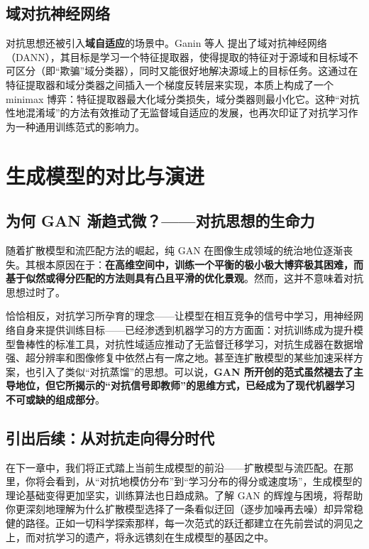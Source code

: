 \subsection{域对抗神经网络}

对抗思想还被引入\textbf{域自适应}的场景中。Ganin 等人\cite{ganin2016domainadversarialtrainingneuralnetworks} 提出了域对抗神经网络（DANN），其目标是学习一个特征提取器，使得提取的特征对于源域和目标域不可区分（即“欺骗”域分类器），同时又能很好地解决源域上的目标任务。这通过在特征提取器和域分类器之间插入一个梯度反转层来实现，本质上构成了一个 minimax 博弈：特征提取器最大化域分类损失，域分类器则最小化它。这种“对抗性地混淆域”的方法有效推动了无监督域自适应的发展，也再次印证了对抗学习作为一种通用训练范式的影响力。

\section{生成模型的对比与演进}

\subsection{为何 GAN 渐趋式微？——对抗思想的生命力}

随着扩散模型和流匹配方法的崛起，纯 GAN 在图像生成领域的统治地位逐渐丧失。其根本原因在于：\textbf{在高维空间中，训练一个平衡的极小极大博弈极其困难，而基于似然或得分匹配的方法则具有凸且平滑的优化景观}。然而，这并不意味着对抗思想过时了。

恰恰相反，对抗学习所孕育的理念——让模型在相互竞争的信号中学习，用神经网络自身来提供训练目标——已经渗透到机器学习的方方面面：对抗训练成为提升模型鲁棒性的标准工具，对抗性域适应推动了无监督迁移学习，对抗生成器在数据增强、超分辨率和图像修复中依然占有一席之地。甚至连扩散模型的某些加速采样方案，也引入了类似“对抗蒸馏”的思想\cite{sauer2022styleganxlscalingstyleganlarge}。可以说，\textbf{GAN 所开创的范式虽然褪去了主导地位，但它所揭示的“对抗信号即教师”的思维方式，已经成为了现代机器学习不可或缺的组成部分}。

\subsection{引出后续：从对抗走向得分时代}

在下一章中，我们将正式踏上当前生成模型的前沿——扩散模型与流匹配。在那里，你将会看到，从“对抗地模仿分布”到“学习分布的得分或速度场”，生成模型的理论基础变得更加坚实，训练算法也日趋成熟。了解 GAN 的辉煌与困境，将帮助你更深刻地理解为什么扩散模型选择了一条看似迂回（逐步加噪再去噪）却异常稳健的路径。正如一切科学探索那样，每一次范式的跃迁都建立在先前尝试的洞见之上，而对抗学习的遗产，将永远镌刻在生成模型的基因之中。